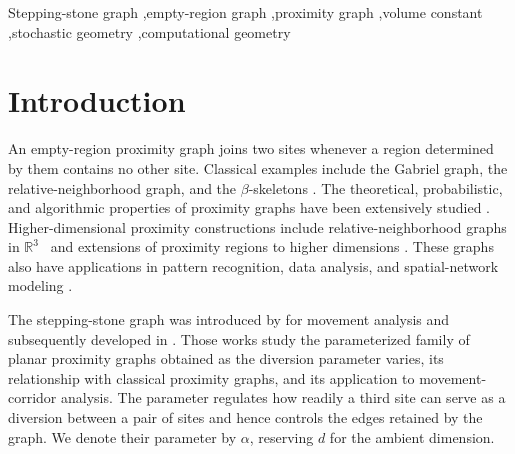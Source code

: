 \documentclass[a4paper,fleqn]{cas-dc}
\theoremstyle{definition}
\theoremstyle{remark}
\newcommand{\R}{\mathds{R}}
\newcommand{\0}{\mathbf{0}}
\begin{document}
\begin{keywords}
Stepping-stone graph \sep empty-region graph \sep proximity graph \sep volume constant \sep stochastic geometry \sep computational geometry
\end{keywords}

\maketitle


\section{Introduction}
An empty-region proximity graph joins two sites whenever a region
determined by them contains no other site. Classical examples include
the Gabriel graph, the relative-neighborhood graph, and the
$\beta$-skeletons
\citep{gabriel1969statistical,toussaint1980relative,
jaromczyk1992relative,kirkpatrick1985framework}.
The theoretical, probabilistic, and algorithmic properties of proximity
graphs have been extensively studied
\citep{bose2013spanners,devroye1988expected,cardinal2009empty}.
Higher-dimensional proximity constructions include
relative-neighborhood graphs in $\R^3$~\citep{agarwal1992relative} and
extensions of proximity regions to higher dimensions
\citep{ceyhan2010extension}.
These graphs also have applications in pattern recognition, data analysis,
and spatial-network modeling
\citep{jaromczyk1992relative,watanabe2008evaluating}.

The stepping-stone graph was introduced by
\citet{kannangara2018stepping} for movement analysis and subsequently
developed in
\citep{kannangara2019stepping}. Those works study the parameterized family
of planar proximity graphs obtained as the diversion parameter varies, its
relationship with classical proximity graphs, and its application to
movement-corridor analysis.
The parameter regulates how readily a third site can serve as a
diversion between a pair of sites and hence controls the edges retained by
the graph. We denote their parameter by $\alpha$, reserving $d$ for the
ambient dimension.
\end{document}
